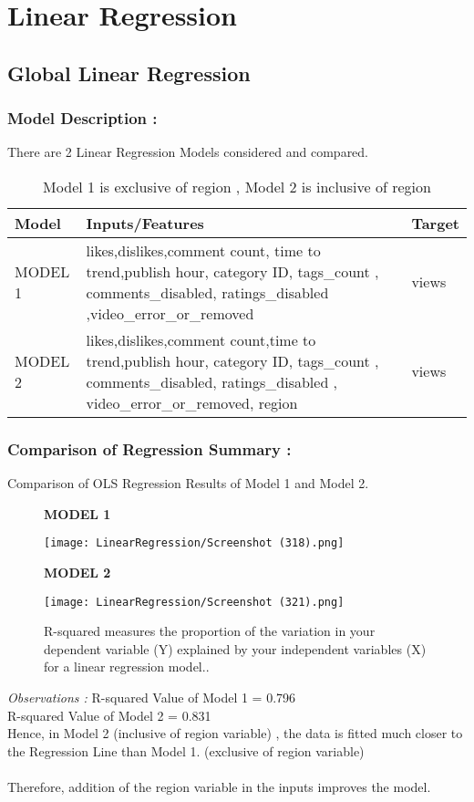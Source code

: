 \documentclass[runningheads]{llncs}
\begin{document}
\newpage
\section{Linear Regression}

\subsection{Global Linear Regression}
\subsubsection{Model Description :}
 There are 2 Linear Regression Models considered and compared.
\begin{table}[H]
\centering
\begin{tabular}{ |p{2cm}|p{12cm}|p{2cm}|  }
\hline
{\Large\bfseries Model} & {\Large\bfseries Inputs/Features} &  {\Large\bfseries Target}\\
\hline
MODEL 1 & likes,dislikes,comment count,
time to trend,publish hour, 
category ID, tags\_count , comments\_disabled, ratings\_disabled ,video\_error\_or\_removed & views \\
\hline
MODEL 2 & likes,dislikes,comment count,time to trend,publish hour, category ID, tags\_count , comments\_disabled, ratings\_disabled ,	video\_error\_or\_removed, region & views \\
\hline
\end{tabular}
\caption{Model 1 is exclusive of region , Model 2 is inclusive of region}\label{tab1}
\end{table}

\subsubsection{Comparison of Regression Summary :}
Comparison of OLS Regression Results of Model 1 and Model 2.
\begin{figure}[H]
\centering
\begin{minipage}{.5\textwidth}
  \centering
   \textbf{MODEL 1}\par\medskip
  \texttt{[image: LinearRegression/Screenshot (318).png]}
\end{minipage}%
\begin{minipage}{.5\textwidth}
  \centering
   \textbf{MODEL 2}\par\medskip
  \texttt{[image: LinearRegression/Screenshot (321).png]}
\end{minipage}
\caption{R-squared measures the proportion of the variation in your dependent variable (Y) explained by your independent variables (X) for a linear regression model..}
\end{figure}
\textit{Observations : } 
R-squared Value of Model 1 = 0.796 \\ 
R-squared Value of Model 2 = 0.831 \\
Hence, in Model 2 (inclusive of region variable) , the data is fitted much closer to the Regression Line than Model 1. (exclusive of region variable)\\
\\ Therefore, addition of the region variable in the inputs improves the model.
\end{document}
